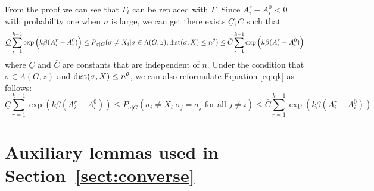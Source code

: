 \documentclass{article}
\begin{document}
\begin{remark}
	From the proof we can see that $\Gamma_i$ can be replaced with $\Gamma$. Since $A_i^r - A_i^0 < 0$ with probability one when
	$n$ is large, we can get there exists $\underline{C}, \bar{C}$ such that
	\begin{equation} \label{eq:qke}
	\underline{C}\sum_{r=1}^{k-1}\exp\Big(k\beta(A^r_i-A^0_i) \Big)  \le 
	P_{\sigma|G}(\sigma \neq X_i | \sigma \in \Lambda(G, z),
	\operatorname{dist}(\sigma, X) \leq n^{\theta})
	\le \bar{C} \sum_{r=1}^{k-1}\exp\Big(k\beta (A^r_i-A^0_i ) \Big) 
	\end{equation}
	where $\underline{C}$ and $\overline{C}$ are constants that are independent of $n$.
	Under the condition that $\bar{\sigma} \in \Lambda(G, z)$ and
	$\operatorname{dist}(\bar{\sigma}, X) \leq n^{\theta}$,
	we can also reformulate Equation \eqref{eq:qk} as follows:
	\begin{equation}\label{eq:soon}
	\underline{C} \sum_{r=1}^{k-1} \exp(k\beta(A^r_i - A^0_i)) \leq P_{\sigma | G}(\sigma_i \neq X_i | \sigma_j = \bar{\sigma}_j \text{ for all } j\neq i ) \leq
	\bar{C} \sum_{r=1}^{k-1} \exp(k\beta(A^r_i - A^0_i))
	\end{equation}
\end{remark}

\appendix
\section{Auxiliary lemmas used in Section~\ref{sect:converse}}\label{ap:6}
\end{document}
